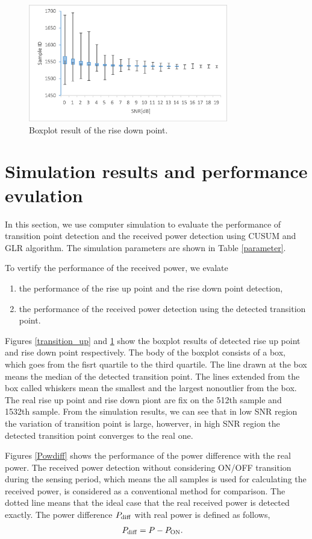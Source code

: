 \begin{figure}[t]
\centering
\includegraphics[width=87mm]{transition_down.eps}
\caption{Boxplot result of the rise down point.}
\label{transition_down}
\end{figure}

\section{Simulation results and performance evulation}
In this section, we use computer simulation to evaluate the performance of transition point detection and the received power detection using CUSUM and GLR algorithm. The simulation parameters are shown in Table \ref{parameter}.

To vertify the performance of the received power, we evalate

\begin{enumerate}
\item the performance of the rise up point and the rise down point detection, 
\item the performance of the received power detection using the detected transition point.
\end{enumerate}
Figures \ref{transition_up} and \ref{transition_down} show the boxplot results of detected rise up point and rise down point respectively. The body of the boxplot consists of a box, which goes from the fisrt quartile to the third quartile. The line drawn at the box means the median of the detected transition point. The lines extended from the box called whiskers mean the smallest and the largest nonoutlier from the box. The real rise up point and rise down piont are fix on the 512th sample and 1532th sample. From the simulation results, we can see that in low SNR region the variation of transition point is large, howerver, in high SNR region the detected transition point converges to the real one.

Figures \ref{Powdiff} shows the performance of the power difference with the real power. 
The received power detection without considering ON/OFF transition during the sensing period, which means the all samples is used for calculating the received power, is considered as a conventional method for comparison. The dotted line means that the ideal case that the real received power is detected exactly. The power difference $P_{\rm diff}$ with real power is defined as follows,
\begin{eqnarray}
P_{{\rm diff}} &= P-P_{{\rm ON}}.
\label{diff}
\end{eqnarray}

